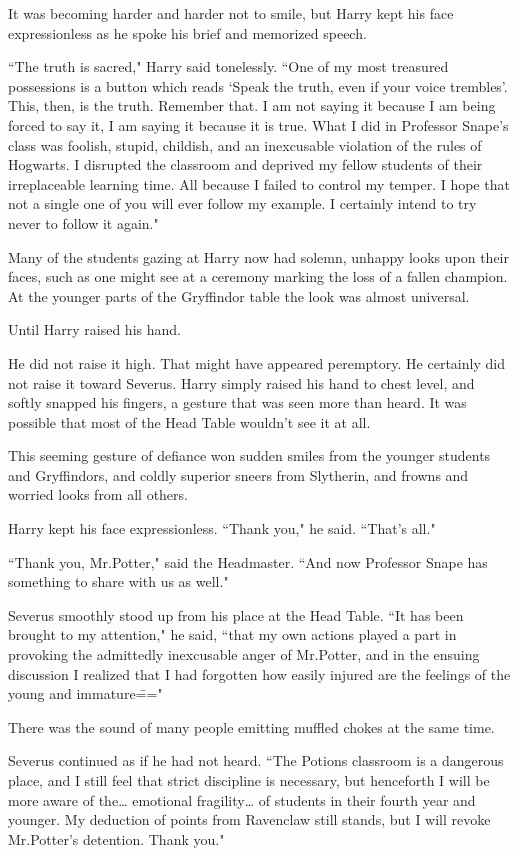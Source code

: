 It was becoming harder and harder not to smile, but Harry kept his face expressionless as he spoke his brief and memorized speech.

``The truth is sacred," Harry said tonelessly. ``One of my most treasured possessions is a button which reads `Speak the truth, even if your voice trembles'. This, then, is the truth. Remember that. I am not saying it because I am being forced to say it, I am saying it because it is true. What I did in Professor Snape's class was foolish, stupid, childish, and an inexcusable violation of the rules of Hogwarts. I disrupted the classroom and deprived my fellow students of their irreplaceable learning time. All because I failed to control my temper. I hope that not a single one of you will ever follow my example. I certainly intend to try never to follow it again."

Many of the students gazing at Harry now had solemn, unhappy looks upon their faces, such as one might see at a ceremony marking the loss of a fallen champion. At the younger parts of the Gryffindor table the look was almost universal.

Until Harry raised his hand.

He did not raise it high. That might have appeared peremptory. He certainly did not raise it toward Severus. Harry simply raised his hand to chest level, and softly snapped his fingers, a gesture that was seen more than heard. It was possible that most of the Head Table wouldn't see it at all.

This seeming gesture of defiance won sudden smiles from the younger students and Gryffindors, and coldly superior sneers from Slytherin, and frowns and worried looks from all others.

Harry kept his face expressionless. ``Thank you," he said. ``That's all."

``Thank you, Mr.\?Potter," said the Headmaster. ``And now Professor Snape has something to share with us as well."

Severus smoothly stood up from his place at the Head Table. ``It has been brought to my attention," he said, ``that my own actions played a part in provoking the admittedly inexcusable anger of Mr.\?Potter, and in the ensuing discussion I realized that I had forgotten how easily injured are the feelings of the young and immature\==="

There was the sound of many people emitting muffled chokes at the same time.

Severus continued as if he had not heard. ``The Potions classroom is a dangerous place, and I still feel that strict discipline is necessary, but henceforth I will be more aware of the{\ldots} emotional fragility{\ldots} of students in their fourth year and younger. My deduction of points from Ravenclaw still stands, but I will revoke Mr.\?Potter's detention. Thank you."

